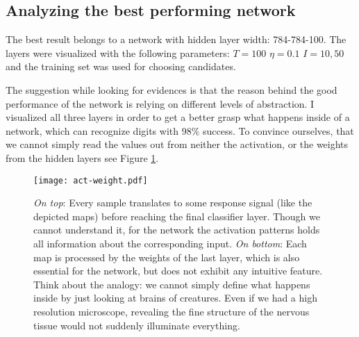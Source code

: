 \subsection{Analyzing the best performing network}
The best result belongs to a network with hidden layer width: 784-784-100. 
The layers were visualized with the following parameters:
$T=100$
$\eta=0.1$
$I=10, 50$
and the training set was used for choosing candidates.

The suggestion while looking for evidences is that the reason behind the good performance of the network is relying on different levels of abstraction.
I visualized all three layers in order to get a better grasp what happens inside of a network, which can recognize digits with $98\%$ success.
To convince ourselves, that we cannot simply read the values out from neither the activation, or the weights from the hidden layers see Figure \ref{fig:act-weight}.

\begin{figure}
    \centering
    \texttt{[image: act-weight.pdf]}
    \caption{\emph{On top}: Every sample translates to some response signal (like the depicted maps) before reaching the final classifier layer. 
    Though we cannot understand it, for the network the activation patterns holds all information about the corresponding input.
    \emph{On bottom}: Each map is processed by the weights of the last layer, which is also essential for the network, but does not exhibit any intuitive feature.
    Think about the analogy: we cannot simply define what happens inside by just looking at brains of creatures. 
    Even if we had a high resolution microscope, revealing the fine structure of the nervous tissue would not suddenly illuminate everything.
    }
    \label{fig:act-weight}
\end{figure}

